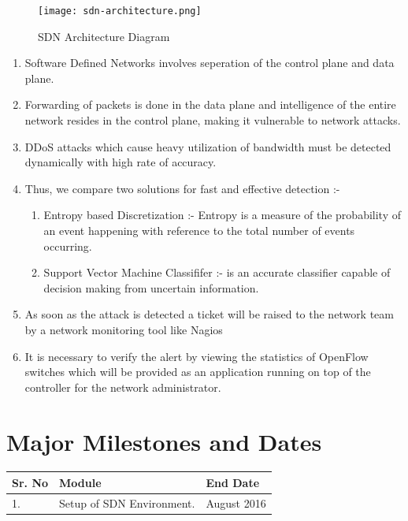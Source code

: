 \documentclass[12pt,a4paper,final]{article}
\begin{document}
\begin{flushleft}
\begin{figure}[H]
\begin{center}
\texttt{[image: sdn-architecture.png]}
\caption{SDN Architecture Diagram}
\end{center}
\end{figure}
\begin{enumerate}
\item
Software Defined Networks involves seperation of the control plane and data plane.

\item
Forwarding of packets is done in the data plane and
intelligence of the entire network resides in the control plane, making it vulnerable to network attacks.

\item
DDoS attacks which cause heavy utilization of bandwidth must be detected dynamically with high rate of accuracy.

\item
Thus, we compare two solutions for fast and effective detection :- 
\begin{enumerate}
\item
Entropy based Discretization :- Entropy is a measure of the probability of an event happening with reference to the total number of events occurring.

\item
Support Vector Machine Classififer :- is an accurate classifier capable of decision making from uncertain information.
\end{enumerate}

\item
As soon
as the attack is detected a ticket will be raised to the network team by a network monitoring tool like Nagios

\item
It is necessary to verify the alert by viewing the statistics of OpenFlow switches which will be provided as an application running on top of the controller for the
network administrator.
\end{enumerate}

\newpage
\noindent
\section{Major Milestones and Dates}
\begin{table}[H]
\begin{tabular}{ | m{1cm} | m{9cm}| m{3cm} | } 
\hline
\textbf{Sr. No} & \textbf{Module} & \textbf{End Date} \\
\hline
1. & 
Setup of SDN Environment. & 
August 2016 \\ 
\hline


\end{tabular}
\end{table}
\end{flushleft}
\end{document}
